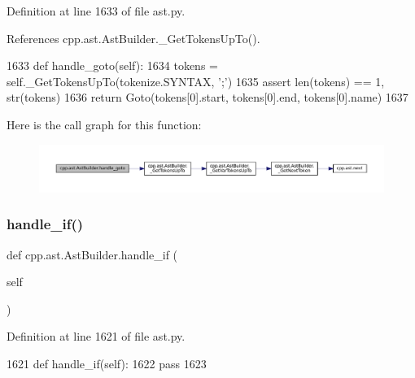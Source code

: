 Definition at line 1633 of file ast.\+py.



References cpp.\+ast.\+Ast\+Builder.\+\_\+\+Get\+Tokens\+Up\+To().


\begin{DoxyCode}
1633     \textcolor{keyword}{def }handle\_goto(self):
1634         tokens = self.\_GetTokensUpTo(tokenize.SYNTAX, \textcolor{stringliteral}{';'})
1635         \textcolor{keyword}{assert} len(tokens) == 1, str(tokens)
1636         \textcolor{keywordflow}{return} Goto(tokens[0].start, tokens[0].end, tokens[0].name)
1637 
\end{DoxyCode}
Here is the call graph for this function\+:
\nopagebreak
\begin{figure}[H]
\begin{center}
\leavevmode
\includegraphics[width=350pt]{classcpp_1_1ast_1_1AstBuilder_a8504d788bb1541ee581918d52d1f4132_cgraph}
\end{center}
\end{figure}
\mbox{\label{classcpp_1_1ast_1_1AstBuilder_a39f2561dfcf36485b2050dff258ece2b}} 
\subsubsection{\texorpdfstring{handle\+\_\+if()}{handle\_if()}}
{\footnotesize\ttfamily def cpp.\+ast.\+Ast\+Builder.\+handle\+\_\+if (\begin{DoxyParamCaption}\item[{}]{self }\end{DoxyParamCaption})}



Definition at line 1621 of file ast.\+py.


\begin{DoxyCode}
1621     \textcolor{keyword}{def }handle\_if(self):
1622         \textcolor{keywordflow}{pass}
1623 
\end{DoxyCode}
\mbox{\label{classcpp_1_1ast_1_1AstBuilder_ab2eb0c18c07584ef246a46865a17ec40}} 
